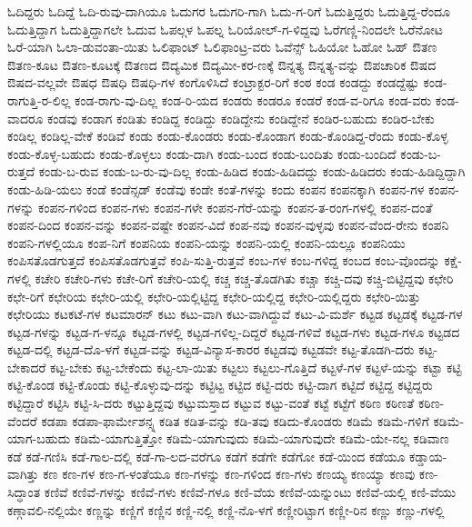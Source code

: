 {ಓದಿದ್ದರು
ಓದಿದ್ದೆ
ಓದಿ-ರುವು-ದಾಗಿಯೂ
ಓದುಗರ
ಓದುಗರಿ-ಗಾಗಿ
ಓದು-ಗ-ರಿಗೆ
ಓದುತ್ತಿದ್ದರು
ಓದುತ್ತಿದ್ದ-ರೆಂದೂ
ಓದುತ್ತಿದ್ದಾಗ
ಓದುತ್ತಿದ್ದಾಗಲೇ
ಓದುವ
ಓಪಲ್ಗಳ
ಓಪಲ್ನ
ಓರಿಯೋಲ್-ಗ-ಳಿದ್ದವು
ಓರೆಗಣ್ಣಿ-ನಿಂದಲೇ
ಓರೆನೋಟ
ಓರೆ-ಯಾಗಿ
ಓಲಾ-ಡುವಂತಾ-ಯಿತು
ಓಲಿಫಾಂಟ್
ಓಲಿಫಾಂಟ್ರ-ವರು
ಓವೆನ್ಸ್
ಓಹಿಯೋ
ಓಹೋ
ಓಹ್
ಔತಣ
ಔತಣ-ಕೂಟ
ಔತಣ-ಕೂಟಕ್ಕೆ
ಔತಣದ
ಔದ್ಯಮಿಕ
ಔದ್ಯಮೀ-ಕರ-ಣಕ್ಕೆ
ಔನ್ನತ್ಯ
ಔನ್ನತ್ಯ-ವನ್ನು
ಔಪಚಾರಿಕ
ಔಷದ
ಔಷದ-ವಲ್ಲವೇ
ಔಷಧ
ಔಷಧಿ
ಔಷಧಿ-ಗಳ
ಕಂಗೊಳಿಸಿದೆ
ಕಂಟ್ರಾಕ್ಟರ-ರಿಗೆ
ಕಂಠ
ಕಂಡ
ಕಂಡದ್ದು
ಕಂಡದ್ದೆಷ್ಟು
ಕಂಡ-ರಾಗುತ್ತಿ-ರ-ಲಿಲ್ಲ
ಕಂಡ-ರಾಗು-ವು-ದಿಲ್ಲ
ಕಂಡ-ರಿ-ಯದ
ಕಂಡರು
ಕಂಡರೂ
ಕಂಡರೆ
ಕಂಡ-ವ-ರಿಗೂ
ಕಂಡ-ವರು
ಕಂಡ-ವಾದರೂ
ಕಂಡವು
ಕಂಡಾಗ
ಕಂಡಿತು
ಕಂಡಿದ್ದ
ಕಂಡಿದ್ದು
ಕಂಡಿದ್ದೇನು
ಕಂಡಿದ್ದೇನೆ
ಕಂಡಿರ-ಬಹುದು
ಕಂಡಿರ-ಬೇಕು
ಕಂಡಿಲ್ಲ
ಕಂಡಿಲ್ಲ-ವೇಕೆ
ಕಂಡಿವೆ
ಕಂಡು
ಕಂಡು-ಕೊಂಡರು
ಕಂಡು-ಕೊಂಡಾಗ
ಕಂಡು-ಕೊಂಡಿದ್ದ-ರೆಂದು
ಕಂಡು-ಕೊಳ್ಳ
ಕಂಡು-ಕೊಳ್ಳ-ಬಹುದು
ಕಂಡು-ಕೊಳ್ಳಲು
ಕಂಡು-ದಾಗಿ
ಕಂಡು-ಬಂದ
ಕಂಡು-ಬಂದಿತು
ಕಂಡು-ಬಂದಿದೆ
ಕಂಡು-ಬ-ರುತ್ತದೆ
ಕಂಡು-ಬ-ರುವ
ಕಂಡು-ಬ-ರು-ವು-ದಿಲ್ಲ
ಕಂಡು-ಹಿಡಿದ
ಕಂಡು-ಹಿಡಿದದ್ದು
ಕಂಡು-ಹಿಡಿದರು
ಕಂಡು-ಹಿಡಿದ್ದಿದ್ದಾಗಿ
ಕಂಡು-ಹಿಡಿ-ಯಲು
ಕಂಡೆ
ಕಂಡೆನ್ಸಡ್
ಕಂಡೆವು
ಕಂಡೇ
ಕಂತೆ-ಗಳನ್ನು
ಕಂದು
ಕಂಪನ
ಕಂಪನಕ್ಕಾಗಿ
ಕಂಪನ-ಗಳ
ಕಂಪನ-ಗಳನ್ನು
ಕಂಪನ-ಗಳಿಂದ
ಕಂಪನ-ಗಳು
ಕಂಪನ-ಗಳೇ
ಕಂಪನ-ಗೆರೆ-ಯನ್ನು
ಕಂಪನ-ತ-ರಂಗ-ಗಳಲ್ಲಿ
ಕಂಪನ-ದಂತೆ
ಕಂಪನ-ದಿಂದ
ಕಂಪನ-ವನ್ನು
ಕಂಪನ-ವಷ್ಟೇ
ಕಂಪನ-ವಿದೆ
ಕಂಪ-ನವು
ಕಂಪನ-ವುಳ್ಳವು
ಕಂಪನ-ವೆಂದ-ರೇನು
ಕಂಪನಿ
ಕಂಪನಿ-ಗಳಲ್ಲಿಯೂ
ಕಂಪ-ನಿಗೆ
ಕಂಪನಿಯ
ಕಂಪನಿ-ಯನ್ನು
ಕಂಪನಿ-ಯಲ್ಲಿ
ಕಂಪನಿ-ಯಲ್ಲೂ
ಕಂಪನಿಯು
ಕಂಪಿಸತೊಡಗುತ್ತದೆ
ಕಂಪಿಸತೊಡಗುತ್ತವೆ
ಕಂಪಿ-ಸುತ್ತಿ-ರುತ್ತವೆ
ಕಂಬ-ಗಳ
ಕಂಬ-ಗಳಿದ್ದ
ಕಂಬದ
ಕಂಬ-ವೊಂದನ್ನು
ಕಕ್ಷೆ-ಗಳಲ್ಲಿ
ಕಚೇರಿ
ಕಚೇರಿ-ಗಳು
ಕಚೇ-ರಿಗೆ
ಕಚೇರಿ-ಯಲ್ಲಿ
ಕಚ್ಚ
ಕಚ್ಚ-ತೊಡಗಿತು
ಕಚ್ಚಾ
ಕಚ್ಚಿ-ದವು
ಕಚ್ಚಿ-ಬಿಟ್ಟಿದ್ದವು
ಕಛೇರಿ
ಕಛೇ-ರಿಗೆ
ಕಛೇರಿಯ
ಕಛೇರಿ-ಯಲ್ಲಿ
ಕಛೇರಿ-ಯಲ್ಲಿಟ್ಟಿದ್ದ
ಕಛೇರಿ-ಯಲ್ಲಿದ್ದ
ಕಛೇರಿ-ಯಲ್ಲಿದ್ದರು
ಕಛೇರಿ-ಯಿತ್ತು
ಕಛೇರಿಯು
ಕಟಕಟೆ-ಗಳ
ಕಟಮಾರನ್
ಕಟು
ಕಟು-ವಾಗಿ
ಕಟು-ವಾಗಿದ್ದುವೆ
ಕಟು-ವಿ-ಮರ್ಶೆ
ಕಟ್ಟಡ
ಕಟ್ಟಡಕ್ಕೆ
ಕಟ್ಟಡ-ಗಳ
ಕಟ್ಟಡ-ಗಳನ್ನು
ಕಟ್ಟಡ-ಗ-ಳನ್ನೂ
ಕಟ್ಟಡ-ಗಳಲ್ಲಿ
ಕಟ್ಟಡ-ಗಳಿಲ್ಲ-ದಿದ್ದರೆ
ಕಟ್ಟಡ-ಗಳಿವೆ
ಕಟ್ಟಡ-ಗಳು
ಕಟ್ಟಡ-ಗಳೂ
ಕಟ್ಟಡದ
ಕಟ್ಟಡ-ದಲ್ಲಿ
ಕಟ್ಟಡ-ದೊ-ಳಗೆ
ಕಟ್ಟಡ-ವನ್ನು
ಕಟ್ಟಡ-ವಿನ್ಯಾಸ-ಕಾರರ
ಕಟ್ಟಡವು
ಕಟ್ಟಡವೇ
ಕಟ್ಟ-ತೊಡಗಿ-ದರು
ಕಟ್ಟ-ಬೇಕಾದರೆ
ಕಟ್ಟ-ಬೇಕು
ಕಟ್ಟ-ಬೇಕೆಂದು
ಕಟ್ಟ-ಲಾ-ಯಿತು
ಕಟ್ಟಲು
ಕಟ್ಟಲು-ಗೊತ್ತಿದೆ
ಕಟ್ಟಳೆ-ಗಳ
ಕಟ್ಟಳೆ-ಯನ್ನು
ಕಟ್ಟಾ
ಕಟ್ಟಿ
ಕಟ್ಟಿ-ಕೊಂಡ
ಕಟ್ಟಿ-ಕೊಂಡು
ಕಟ್ಟಿ-ಕೊಳ್ಳುವು-ದನ್ನು
ಕಟ್ಟಿಟ್ಟ
ಕಟ್ಟಿದ
ಕಟ್ಟಿ-ದರು
ಕಟ್ಟಿ-ದಾಗ
ಕಟ್ಟಿದೆ
ಕಟ್ಟಿದ್ದ
ಕಟ್ಟಿದ್ದರು
ಕಟ್ಟಿದ್ದಾರೆ
ಕಟ್ಟಿಸಿ
ಕಟ್ಟಿ-ಸಿ-ದರು
ಕಟ್ಟುತ್ತಿದ್ದವು
ಕಟ್ಟುಮಸ್ತಾದ
ಕಟ್ಟುವ
ಕಟ್ಟು-ವಂತೆ
ಕಟ್ಟೆ
ಕಟ್ಟೆಗೆ
ಕಠಿಣ
ಕಠಿಣತೆ
ಕಠಿಣ-ವೆಂದರೆ
ಕಡಪಾ
ಕಡಪಾ-ಫಾರ್ಮೇಶನ್ಸ್ನ
ಕಡಿತ
ಕಡಿತ-ವನ್ನು
ಕಡಿ-ತವು
ಕಡಿದು-ಕೊಂಡರು
ಕಡಿಮೆ
ಕಡಿಮೆ-ಗಳಿಗೆ
ಕಡಿಮೆ-ಯಾಗ-ಬಹುದು
ಕಡಿಮೆ-ಯಾಗುತ್ತಿತ್ತೋ
ಕಡಿಮೆ-ಯಾಗುವುದು
ಕಡಿಮೆ-ಯಾಗುವುದೇ
ಕಡಿಮೆ-ಯೇ-ನಲ್ಲ
ಕಡಿವಾಣ
ಕಡೆ
ಕಡೆ-ಗಣಿಸಿ
ಕಡೆ-ಗಾಲ-ದಲ್ಲಿ
ಕಡೆ-ಗಾ-ಲದ-ವರೆಗೂ
ಕಡೆಗೆ
ಕಡೆಗೇ
ಕಡೆಗೋ
ಕಡೆ-ಯಿಂದ
ಕಡೆಯೂ
ಕಡ್ಡಾಯ-ವಾಗಿತ್ತು
ಕಣ
ಕಣ-ಗಳ
ಕಣ-ಗ-ಳಂತೆಯೂ
ಕಣ-ಗಳನ್ನು
ಕಣ-ಗಳಿಂದ
ಕಣ-ಗಳು
ಕಣಯ್ಯ
ಕಣಯ್ಯಾ
ಕಣವು
ಕಣ-ಸಿದ್ಧಾಂತ
ಕಣಿವೆ
ಕಣಿವೆ-ಗಳನ್ನು
ಕಣಿವೆ-ಗಳು
ಕಣಿವೆ-ಗಳೂ
ಕಣಿ-ವೆಯ
ಕಣಿವೆ-ಯನ್ನುಂಟು
ಕಣಿವೆ-ಯಲ್ಲಿ
ಕಣಿ-ವೆಯು
ಕಣ್ಗಾವಲಿ-ನಲ್ಲಿಯೇ
ಕಣ್ಣನ್ನು
ಕಣ್ಣಿಗೆ
ಕಣ್ಣಿನ
ಕಣ್ಣಿ-ನಲ್ಲಿ
ಕಣ್ಣಿ-ನೊ-ಳಗೆ
ಕಣ್ಣೀರಿಟ್ಟಾಗ
ಕಣ್ಣೀ-ರಿನ
ಕಣ್ಣು
ಕಣ್ಣು-ಗಳಲ್ಲಿ
}
